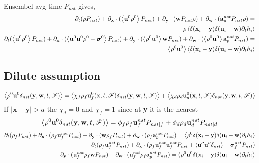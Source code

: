 \documentclass[11pt]{My_preprint}
\begin{document}
Ensembel avg time $P_{nst}$ gives, 
\begin{align*}
    \partial_t (\rho P_{nst}) 
    + {\partial_\textbf{x}} \cdot (\left<\textbf{u}^0 \rho^0 \right> P_{nst})
    + {\partial_\textbf{y}} \cdot (\textbf{w}  P_{nst} \rho)
    + {\partial_\textbf{w}} \cdot (\textbf{a}_p^{nst} P_{nst}\rho)
    = \\
    \rho \left<\delta(\textbf{x}_i -\textbf{y}) \delta(\textbf{u}_i - \textbf{w}) \partial_t h_i \right>
    \\
    \partial_t (\left<\textbf{u}^0 \rho^0 \right> P_{nst})
    + {\partial_\textbf{x}} \cdot (\left<\textbf{u}^0 \textbf{u}^0 \rho^0  - \bm\sigma^0 \right> P_{nst})
    + {\partial_\textbf{y}} \cdot ( \left<\rho^0 \textbf{u}^0\right> \textbf{w}   P_{nst} )
    + {\partial_\textbf{w}} \cdot ( \left<\rho^0 \textbf{u}^0\right> \textbf{a}_p^{nst} P_{nst} )
    = \\
    \left<\rho^0 \textbf{u}^0\right>  
    \left<\delta(\textbf{x}_i -\textbf{y}) \delta(\textbf{u}_i - \textbf{w}) \partial_t h_i \right>
    \\
\end{align*}


\subsection*{Dilute assumption}
\begin{equation*}
    \left<\rho^0 \textbf{u}^0 \delta_{nst}(\textbf{y},\textbf{w},t,\mathscr{F})\right> 
    = 
    \left<\chi_f\rho_f \textbf{u}^0_f(\textbf{x},t,\mathscr{F}) \delta_{nst}(\textbf{y},\textbf{w},t,\mathscr{F})\right> 
    + \left<\chi_d\rho_d \textbf{u}^0_d(\textbf{x},t,\mathscr{F}) \delta_{nst}(\textbf{y},\textbf{w},t,\mathscr{F})\right> 
\end{equation*}
If $|\textbf{x}-\textbf{y}| > a$ the $\chi_d = 0$ and $\chi_f = 1$ since at \textbf{y} it is the nearest
\begin{equation*}
    \left<\rho^0 \textbf{u}^0 \delta_{nst}(\textbf{y},\textbf{w},t,\mathscr{F})\right> 
    = 
    \phi_f \rho_f \textbf{u}_f^{nst} P_{nst|f}
    + \phi_d \rho_d \textbf{u}_d^{nst} P_{nst|d}
\end{equation*}
\begin{align*}
    \partial_t (\rho_f P_{nst}) 
    + {\partial_\textbf{x}} \cdot (\rho_f \textbf{u}_f^{nst} P_{nst})
    + {\partial_\textbf{y}} \cdot (\textbf{w}   \rho_f P_{nst})
    + {\partial_\textbf{w}} \cdot ( \rho_f \textbf{a}_p^{nst} P_{nst})
    = 
    \left<\rho^0 \delta(\textbf{x}_i -\textbf{y}) \delta(\textbf{u}_i - \textbf{w}) \partial_t h_i \right>
    \\
    \partial_t ( \rho_f\textbf{u}_f^{nst} P_{nst})
    + {\partial_\textbf{x}} \cdot ( \rho_f \textbf{u}_f^{nst}\textbf{u}_f^{nst}P_{nst} + \left<\textbf{u}''\textbf{u}''\delta_{nst}\right> - \bm\sigma_f^{nst} P_{nst})\\
    + {\partial_\textbf{y}} \cdot (\textbf{u}^{nst}_f \rho_f \textbf{w}   P_{nst} )
    + {\partial_\textbf{w}} \cdot (\textbf{u}^{nst}_f \rho_f \textbf{a}_p^{nst} P_{nst} )
    = \left<\rho^0 \textbf{u}^0  
    \delta(\textbf{x}_i -\textbf{y}) \delta(\textbf{u}_i - \textbf{w}) \partial_t h_i \right>
    \\
\end{align*}
\end{document}
